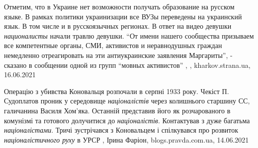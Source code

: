 Отметим, что в Украине нет возможности получать образование на русском языке. В
рамках политики украинизации все ВУЗы переведены на украинский язык. В том
числе и в русскоязычных регионах.  В ответ на видео девушки \emph{националисты} начали
травлю девушки.  \enquote{От имени нашего сообщества призываем все компетентные органы,
СМИ, активистов и неравнодушных граждан немедленно отреагировать на эти
антиукраинские заявления Маргариты}, - сказано в сообщении одной из групп
\enquote{мовных активистов}
, , kharkov.strana.ua, 16.06.2021

Операцію з убивства Коновальця розпочали в серпні 1933 року. Чекіст П.
Судоплатов проник у середовище \emph{націоналістів} через колишнього старшину СС,
галичанина Василя Хом'яка. Останній представив його як розчарованого в
комунізмі та готового долучитися до \emph{націоналістів}. Контактував з дуже багатьма
\emph{націоналістами}. Тричі зустрічався з Коновальцем і спілкувався про розвиток
\emph{націоналістичного руху} в УРСР
, 
Ірина Фаріон, blogs.pravda.com.ua, 14.06.2021

